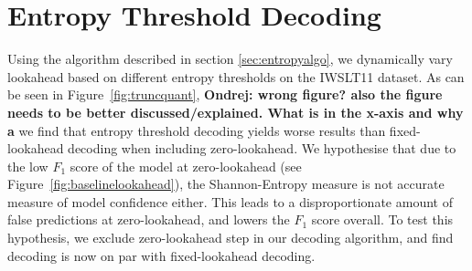 \documentclass[bsc,deptreport,ai]{infthesis} %
\newcommand{\Ondrej}[1]{{\color{red} \textbf{Ondrej: #1}}}
\begin{document}
\section{Entropy Threshold Decoding}
Using the algorithm described in section \ref{sec:entropyalgo}, we dynamically vary lookahead based on different entropy thresholds on the IWSLT11 dataset. As can be seen in Figure~\ref{fig:truncquant},\Ondrej{wrong figure? also the figure needs to be better discussed/explained. What is in the x-axis and why a} we find that entropy threshold decoding yields worse results than fixed-lookahead decoding when including zero-lookahead. We hypothesise that due to the low $F_1$ score of the model at zero-lookahead (see Figure~\ref{fig:baselinelookahead}), the Shannon-Entropy measure is not accurate measure of model confidence either. This leads to a disproportionate amount of false predictions at zero-lookahead, and lowers the $F_1$ score overall. To test this hypothesis, we exclude zero-lookahead step in our decoding algorithm, and find decoding is now on par with fixed-lookahead decoding.
\end{document}

